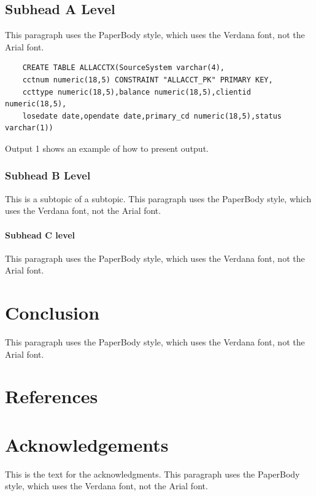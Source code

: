 \documentclass{sugconf}
\begin{document}
\subsection{Subhead A Level }

This paragraph uses the PaperBody style, which uses the Verdana font, not the Arial font.

\begin{verbatim}
    CREATE TABLE ALLACCTX(SourceSystem varchar(4),
    cctnum numeric(18,5) CONSTRAINT "ALLACCT_PK" PRIMARY KEY,
    ccttype numeric(18,5),balance numeric(18,5),clientid numeric(18,5),
    losedate date,opendate date,primary_cd numeric(18,5),status varchar(1))
\end{verbatim}

Output 1 shows an example of how to present output.

\subsubsection{Subhead B Level}

This is a subtopic of a subtopic. This paragraph uses the PaperBody style, which uses the Verdana font, not the Arial font.

\paragraph{Subhead C level}

This paragraph uses the PaperBody style, which uses the Verdana font, not the Arial font. 

\section{Conclusion}

This paragraph uses the PaperBody style, which uses the Verdana font, not the Arial font.

\section{References}

\nocite{*}



\section{Acknowledgements}

This is the text for the acknowledgments. This paragraph uses the PaperBody style, which uses the Verdana font, not the Arial font.
\end{document}
